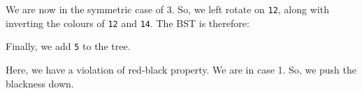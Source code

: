 \documentclass[a4paper, openany]{memoir}
\begin{document}
\begin{center}
\end{center}
We are now in the symmetric case of 3. So, we left rotate on \texttt{12}, along with inverting the colours of \texttt{12} and \texttt{14}. The BST is therefore:
\begin{center}
\end{center}
Finally, we add \texttt{5} to the tree.
\begin{center}
\end{center}
Here, we have a violation of red-black property. We are in case 1. So, we push the blackness down.
\end{document}
